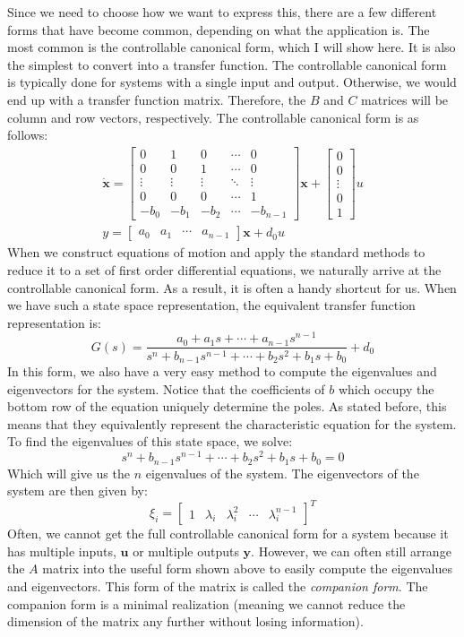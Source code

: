 Since we need to choose how we want to express this, there are a few different forms that have become common, depending on what the application is. The most common is the controllable canonical form, which I will show here. It is also the simplest to convert into a transfer function. The controllable canonical form is typically done for systems with a single input and output. Otherwise, we would end up with a transfer function matrix. Therefore, the $B$ and $C$ matrices will be column and row vectors, respectively. The controllable canonical form is as follows:
\begin{gather}
\bm{\dot{x}}=\begin{bmatrix}
    0&1&0&\cdots&0\\
    0&0&1&\cdots&0\\
    \vdots&\vdots&\vdots&\ddots&\vdots\\
    0&0&0&\cdots&1\\
    -b_0&-b_1&-b_2&\cdots&-b_{n-1}
\end{bmatrix}\bm{x}+\begin{bmatrix}
    0\\0\\\vdots\\0\\1
\end{bmatrix}u\\
y=\begin{bmatrix}
a_0&a_1&\cdots &a_{n-1}
\end{bmatrix}\bm{x}+d_0u
\end{gather}
When we construct equations of motion and apply the standard methods to reduce it to a set of first order differential equations, we naturally arrive at the controllable canonical form. As a result, it is often a handy shortcut for us. When we have such a state space representation, the equivalent transfer function representation is:
$$G(s)=\frac{a_0+a_1s+\cdots+a_{n-1}s^{n-1}}{s^n+b_{n-1}s^{n-1}+\cdots+b_2s^2+b_1s+b_0}+d_0$$
In this form, we also have a very easy method to compute the eigenvalues and eigenvectors for the system. Notice that the coefficients of $b$ which occupy the bottom row of the equation uniquely determine the poles. As stated before, this means that they equivalently represent the characteristic equation for the system. To find the eigenvalues of this state space, we solve:
$$s^n+b_{n-1}s^{n-1}+\cdots+b_2s^2+b_1s+b_0=0$$
Which will give us the $n$ eigenvalues of the system. The eigenvectors of the system are then given by:
$$\xi_i=\begin{bmatrix}
1&\lambda_i&\lambda_i^2&\cdots&\lambda_i^{n-1}
\end{bmatrix}^T$$
Often, we cannot get the full controllable canonical form for a system because it has multiple inputs, $\bm{u}$ or multiple outputs $\bm{y}$. However, we can often still arrange the $A$ matrix into the useful form shown above to easily compute the eigenvalues and eigenvectors. This form of the matrix is called the \textit{companion form}. The companion form is a minimal realization (meaning we cannot reduce the dimension of the matrix any further without losing information). 

